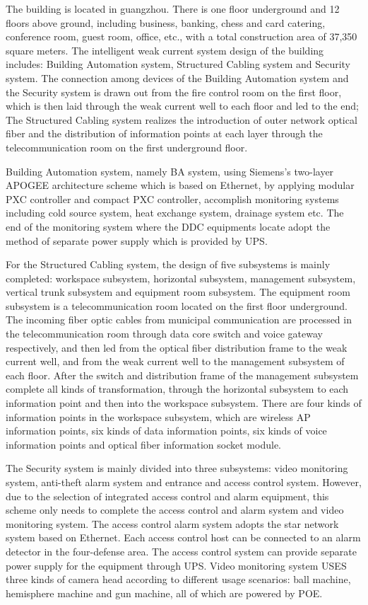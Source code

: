 \documentclass{gdutart}
\begin{document}
  \begin{eabstract} The building is located in guangzhou. There is one floor underground and 12 floors above ground, including business, banking, chess and card catering, conference room, guest room, office, etc., with a total construction area of 37,350 square meters. The intelligent weak current system design of the building includes: Building Automation system, Structured Cabling system and Security system. The connection among devices of the Building Automation system and the Security system is drawn out from the fire control room on the first floor, which is then laid through the weak current well to each floor and led to the end; The Structured Cabling system realizes the introduction of outer network optical fiber and the distribution of information points at each layer through the telecommunication room on the first underground floor.

  Building Automation system, namely BA system, using Siemens's two-layer APOGEE architecture scheme which is based on Ethernet, by applying modular PXC controller and compact PXC controller, accomplish monitoring systems including cold source system, heat exchange system, drainage system etc. The end of the monitoring system where the DDC equipments locate adopt the method of separate power supply which is provided by UPS.

  For the Structured Cabling system, the design of five subsystems is mainly completed: workspace subsystem, horizontal subsystem, management subsystem, vertical trunk subsystem and equipment room subsystem. The equipment room subsystem is a telecommunication room located on the first floor underground. The incoming fiber optic cables from municipal communication are processed in the telecommunication room through data core switch and voice gateway respectively, and then led from the optical fiber distribution frame to the weak current well, and from the weak current well to the management subsystem of each floor. After the switch and distribution frame of the management subsystem complete all kinds of transformation, through the horizontal subsystem to each information point and then into the workspace subsystem. There are four kinds of information points in the workspace subsystem, which are wireless AP information points, six kinds of data information points, six kinds of voice information points and optical fiber information socket module.

  The Security system is mainly divided into three subsystems: video monitoring system, anti-theft alarm system and entrance and access control system. However, due to the selection of integrated access control and alarm equipment, this scheme only needs to complete the access control and alarm system and video monitoring system. The access control alarm system adopts the star network system based on Ethernet. Each access control host can be connected to an alarm detector in the four-defense area. The access control system can provide separate power supply for the equipment through UPS. Video monitoring system USES three kinds of camera head according to different usage scenarios: ball machine, hemisphere machine and gun machine, all of which are powered by POE.
  \end{eabstract}
\end{document}

